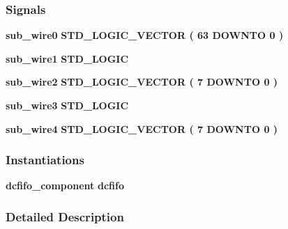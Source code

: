 \subsubsection*{Signals}
 \begin{DoxyCompactItemize}
\item 
{\bf sub\+\_\+wire0} {\bfseries \textcolor{comment}{S\+T\+D\+\_\+\+L\+O\+G\+I\+C\+\_\+\+V\+E\+C\+T\+OR}\textcolor{vhdlchar}{ }\textcolor{vhdlchar}{(}\textcolor{vhdlchar}{ }\textcolor{vhdlchar}{ } \textcolor{vhdldigit}{63} \textcolor{vhdlchar}{ }\textcolor{keywordflow}{D\+O\+W\+N\+TO}\textcolor{vhdlchar}{ }\textcolor{vhdlchar}{ } \textcolor{vhdldigit}{0} \textcolor{vhdlchar}{ }\textcolor{vhdlchar}{)}\textcolor{vhdlchar}{ }} 
\item 
{\bf sub\+\_\+wire1} {\bfseries \textcolor{comment}{S\+T\+D\+\_\+\+L\+O\+G\+IC}\textcolor{vhdlchar}{ }} 
\item 
{\bf sub\+\_\+wire2} {\bfseries \textcolor{comment}{S\+T\+D\+\_\+\+L\+O\+G\+I\+C\+\_\+\+V\+E\+C\+T\+OR}\textcolor{vhdlchar}{ }\textcolor{vhdlchar}{(}\textcolor{vhdlchar}{ }\textcolor{vhdlchar}{ } \textcolor{vhdldigit}{7} \textcolor{vhdlchar}{ }\textcolor{keywordflow}{D\+O\+W\+N\+TO}\textcolor{vhdlchar}{ }\textcolor{vhdlchar}{ } \textcolor{vhdldigit}{0} \textcolor{vhdlchar}{ }\textcolor{vhdlchar}{)}\textcolor{vhdlchar}{ }} 
\item 
{\bf sub\+\_\+wire3} {\bfseries \textcolor{comment}{S\+T\+D\+\_\+\+L\+O\+G\+IC}\textcolor{vhdlchar}{ }} 
\item 
{\bf sub\+\_\+wire4} {\bfseries \textcolor{comment}{S\+T\+D\+\_\+\+L\+O\+G\+I\+C\+\_\+\+V\+E\+C\+T\+OR}\textcolor{vhdlchar}{ }\textcolor{vhdlchar}{(}\textcolor{vhdlchar}{ }\textcolor{vhdlchar}{ } \textcolor{vhdldigit}{7} \textcolor{vhdlchar}{ }\textcolor{keywordflow}{D\+O\+W\+N\+TO}\textcolor{vhdlchar}{ }\textcolor{vhdlchar}{ } \textcolor{vhdldigit}{0} \textcolor{vhdlchar}{ }\textcolor{vhdlchar}{)}\textcolor{vhdlchar}{ }} 
\end{DoxyCompactItemize}
\subsubsection*{Instantiations}
 \begin{DoxyCompactItemize}
\item 
{\bf dcfifo\+\_\+component}  {\bfseries dcfifo}   
\end{DoxyCompactItemize}


\subsubsection{Detailed Description}


